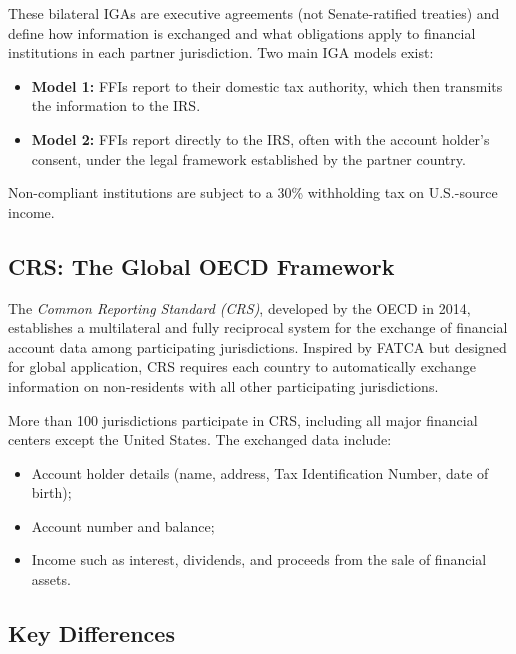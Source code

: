 \documentclass[12pt]{article}
\begin{document}
These bilateral IGAs are executive agreements (not Senate-ratified treaties) and define how information is exchanged and what obligations apply to financial institutions in each partner jurisdiction. Two main IGA models exist:
\begin{itemize}
    \item \textbf{Model 1:} FFIs report to their domestic tax authority, which then transmits the information to the IRS.
    \item \textbf{Model 2:} FFIs report directly to the IRS, often with the account holder’s consent, under the legal framework established by the partner country.
\end{itemize}

Non-compliant institutions are subject to a 30\% withholding tax on U.S.-source income.

\subsection{CRS: The Global OECD Framework}
The \textit{Common Reporting Standard (CRS)}, developed by the OECD in 2014, establishes a multilateral and fully reciprocal system for the exchange of financial account data among participating jurisdictions. Inspired by FATCA but designed for global application, CRS requires each country to automatically exchange information on non-residents with all other participating jurisdictions.

More than 100 jurisdictions participate in CRS, including all major financial centers except the United States. The exchanged data include:
\begin{itemize}
    \item Account holder details (name, address, Tax Identification Number, date of birth);
    \item Account number and balance;
    \item Income such as interest, dividends, and proceeds from the sale of financial assets.
\end{itemize}

\subsection{Key Differences}
\end{document}
